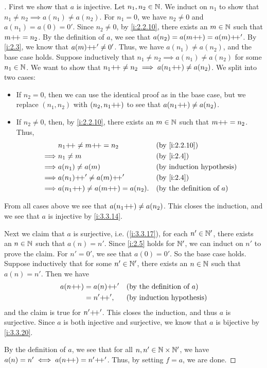 \begin{proof}[]
  First we show that \(a\) is injective.
  Let \(n_1, n_2 \in \mathbb{N}\).
  We induct on \(n_1\) to show that \(n_1 \neq n_2 \implies a(n_1) \neq a(n_2)\).
  For \(n_1 = 0\), we have \(n_2 \neq 0\) and \(a(n_1) = a(0) = 0'\).
  Since \(n_2 \neq 0\), by \cref{i:2.2.10}, there exists an \(m \in \mathbb{N}\) such that \(m{+}\!{+} = n_2\).
  By the definition of \(a\), we see that \(a(n_2) = a(m{+}\!{+}) = a(m){+}\!{+}'\).
  By \cref{i:2.3}, we know that \(a(m){+}\!{+}' \neq 0'\).
  Thus, we have \(a(n_1) \neq a(n_2)\), and the base case holds.
  Suppose inductively that \(n_1 \neq n_2 \implies a(n_1) \neq a(n_2)\) for some \(n_1 \in \mathbb{N}\).
  We want to show that \(n_1{+}\!{+} \neq n_2 \implies a(n_1{+}\!{+}) \neq a(n_2)\).
  We split into two cases:
  \begin{itemize}
    \item If \(n_2 = 0\), then we can use the identical proof as in the base case, but we replace \((n_1, n_2)\) with \((n_2, n_1{+}\!{+})\) to see that \(a(n_1{+}\!{+}) \neq a(n_2)\).
    \item If \(n_2 \neq 0\), then, by \cref{i:2.2.10}, there exists an \(m \in \mathbb{N}\) such that \(m{+}\!{+} = n_2\).
          Thus,
          \begin{align*}
                     & n_1\pp \neq m\pp = n_2           &  & \by{i:2.2.10}                       \\
            \implies & n_1 \neq m                       &  & \by{i:2.4}                          \\
            \implies & a(n_1) \neq a(m)                 &  & \byIH                               \\
            \implies & a(n_1)\pp' \neq a(m)\pp'         &  & \by{i:2.4}                          \\
            \implies & a(n_1\pp) \neq a(m\pp) = a(n_2). &  & \text{(by the definition of \(a\))}
          \end{align*}
  \end{itemize}
  From all cases above we see that \(a(n_1{+}\!{+}) \neq a(n_2)\).
  This closes the induction, and we see that \(a\) is injective by \cref{i:3.3.14}.

  Next we claim that \(a\) is surjective, i.e. (\cref{i:3.3.17}), for each \(n' \in \mathbb{N}'\), there exists an \(n \in \mathbb{N}\) such that \(a(n) = n'\).
  Since \cref{i:2.5} holds for \(\mathbb{N}'\), we can induct on \(n'\) to prove the claim.
  For \(n' = 0'\), we see that \(a(0) = 0'\).
  So the base case holds.
  Suppose inductively that for some \(n' \in \mathbb{N}'\), there exists an \(n \in \mathbb{N}\) such that \(a(n) = n'\).
  Then we have
  \begin{align*}
    a(n{+}\!{+}) & = a(n){+}\!{+}' &  & \text{(by the definition of \(a\))} \\
            & = n'{+}\!{+}',  &  & \text{(by induction hypothesis)}
  \end{align*}
  and the claim is true for \(n'{+}\!{+}'\).
  This closes the induction, and thus \(a\) is surjective.
  Since \(a\) is both injective and surjective, we know that \(a\) is bijective by \cref{i:3.3.20}.

  By the definition of \(a\), we see that for all \(n, n' \in \mathbb{N} \times \mathbb{N}'\), we have \(a(n) = n' \iff a(n{+}\!{+}) = n'{+}\!{+}'\).
  Thus, by setting \(f = a\), we are done.
\end{proof}
